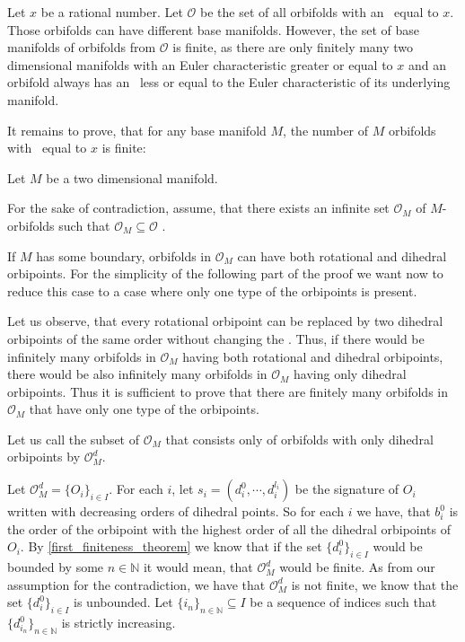 Let $x$ be a rational number. 
Let $\mathcal{O}$ be the set of all orbifolds with 
an \Eoc\ equal to $x$. 
Those orbifolds can have different base manifolds. However, the set of base manifolds of 
orbifolds from $\mathcal{O}$ is finite, as there are only finitely many 
two dimensional manifolds with an Euler characteristic greater or equal to $x$ and an 
orbifold always has 
an \Eoc\ less or equal to the Euler characteristic of its underlying manifold. 

It remains to prove, that for any base manifold $M$, the number of $M$ orbifolds 
with \Eoc\ equal to $x$ is finite: 

Let $M$ be a two dimensional manifold. 

For the sake of contradiction, assume, that there exists an infinite set $\mathcal{O}_M$
of $M$-orbifolds such that $\mathcal{O}_M \subseteq \mathcal{O}$ 
.

If $M$ has some boundary, orbifolds in $\mathcal{O}_M$ 
can have both rotational and dihedral orbipoints. 
For the simplicity of the following part of the proof we want now to reduce this case 
to a case 
where only one type of the orbipoints is present. 

Let us observe, that every rotational orbipoint can be replaced by two dihedral orbipoints 
of the same order without changing the \Eoc. Thus, if there would be infinitely many 
orbifolds in $\mathcal{O}_M$ having both rotational and dihedral orbipoints, there would be 
also infinitely many orbifolds in $\mathcal{O}_M$ having only dihedral orbipoints. 
Thus it is sufficient to prove that there are finitely many orbifolds in $\mathcal{O}_M$ 
that have only one type of the orbipoints. 


Let us call the subset of $\mathcal{O}_M$ 
that consists only of orbifolds with only dihedral orbipoints by $\mathcal{O}_M^d$.

Let $\mathcal{O}_M^d = \{O_i\}_{i \in I}$. 
For each $i$, let $s_i = (d^0_i, \cdots, d^{l_i}_i)$ be the signature 
of $O_i$ written with decreasing orders of 
dihedral points. So for each $i$ we have, that $b^0_i$ is 
the order of the orbipoint with the highest order of all the dihedral orbipoints of 
$O_i$. 
By \ref{first_finiteness_theorem} we know that if the set $\{d^0_i\}_{i \in I}$ 
would be bounded 
by some $n \in \mathbb{N}$ it would mean, that $\mathcal{O}_M^d$ would be finite. As 
from our assumption for the contradiction, we have that $\mathcal{O}_M^d$ is not finite, we know
that the set $\{d^0_i\}_{i \in I}$ is unbounded. 
Let $\{i_n\}_{n\in \mathbb{N}} \subseteq I$ be a sequence of indices such that
$\{d^0_{i_n}\}_{n\in \mathbb{N}}$ is strictly increasing. 

